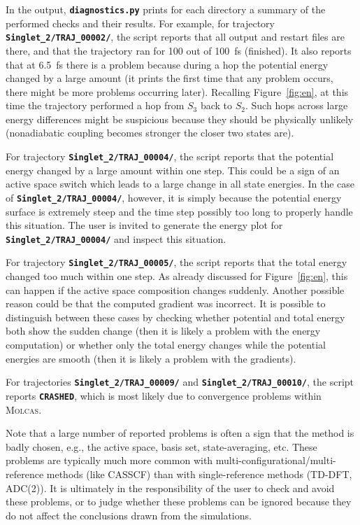 \documentclass[a4paper,11pt,DIV=15,openany]{scrbook}
\newcommand{\ttt}[1]{\textbf{\texttt{#1}}}
\begin{document}
\normalsize

In the output, \ttt{diagnostics.py} prints for each directory a summary of the performed checks and their results.
For example, for trajectory \ttt{Singlet\_2/TRAJ\_00002/}, the script reports that all output and restart files are there, and that the trajectory ran for 100 out of 100~fs (finished).
It also reports that at 6.5~fs there is a problem because during a hop the potential energy changed by a large amount (it prints the first time that any problem occurs, there might be more problems occurring later).
Recalling Figure~\ref{fig:en}, at this time the trajectory performed a hop from $S_3$ back to $S_2$.
Such hops across large energy differences might be suspicious because they should be physically unlikely (nonadiabatic coupling becomes stronger the closer two states are).

For trajectory \ttt{Singlet\_2/TRAJ\_00004/}, the script reports that the potential energy changed by a large amount within one step.
This could be a sign of an active space switch which leads to a large change in all state energies.
In the case of \ttt{Singlet\_2/TRAJ\_00004/}, however, it is simply because the potential energy surface is extremely steep and the time step possibly too long to properly handle this situation.
The user is invited to generate the energy plot for \ttt{Singlet\_2/TRAJ\_00004/} and inspect this situation.

For trajectory \ttt{Singlet\_2/TRAJ\_00005/}, the script reports that the total energy changed too much within one step.
As already discussed for Figure~\ref{fig:en}, this can happen if the active space composition changes suddenly.
Another possible reason could be that the computed gradient was incorrect.
It is possible to distinguish between these cases by checking whether potential and total energy both show the sudden change (then it is likely a problem with the energy computation) or whether only the total energy changes while the potential energies are smooth (then it is likely a problem with the gradients).

For trajectories \ttt{Singlet\_2/TRAJ\_00009/} and  \ttt{Singlet\_2/TRAJ\_00010/}, the script reports \ttt{CRASHED}, which is most likely due to convergence problems within \textsc{Molcas}.

Note that a large number of reported problems is often a sign that the method is badly chosen, e.g., the active space, basis set, state-averaging, etc. 
These problems are typically much more common with multi-configurational/multi-reference methods (like CASSCF) than with single-reference methods (TD-DFT, ADC(2)).
It is ultimately in the responsibility of the user to check and avoid these problems, or to judge whether these problems can be ignored because they do not affect the conclusions drawn from the simulations.
\end{document}
